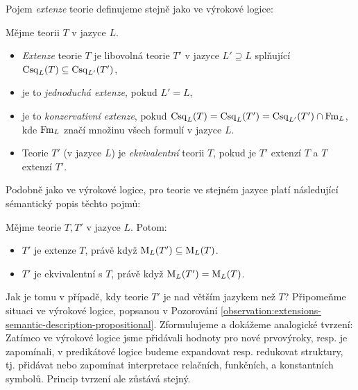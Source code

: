Pojem \emph{extenze} teorie definujeme stejně jako ve výrokové logice:

\begin{definition}
    Mějme teorii $T$ v jazyce $L$.
    \begin{itemize}
        \item \emph{Extenze} teorie $T$ je libovolná teorie $T'$ v jazyce $L'\supseteq L$ splňující $\operatorname{Csq}_L(T)\subseteq\operatorname{Csq}_{L'}(T')$,
        \item je to \emph{jednoduchá extenze}, pokud $L'=L$,
        \item je to \emph{konzervativní extenze}, pokud $\operatorname{Csq}_L(T)=\operatorname{Csq}_L(T')=\operatorname{Csq}_{L'}(T')\cap \operatorname{Fm}_L$, kde $\operatorname{Fm}_L$ značí množinu všech formulí v jazyce $L$.
        \item Teorie $T'$ (v jazyce $L$) je \emph{ekvivalentní} teorii $T$, pokud je $T'$ extenzí $T$ a $T$ extenzí $T'$.
    \end{itemize}
\end{definition}

Podobně jako ve výrokové logice, pro teorie ve stejném jazyce platí následující sémantický popis těchto pojmů:

\begin{observation}
Mějme teorie $T,T'$ v jazyce $L$. Potom:
\begin{itemize}
    \item $T'$ je extenze $T$, právě když $\operatorname{M}_L(T')\subseteq\operatorname{M}_L(T)$.
    \item $T'$ je ekvivalentní s $T$, právě když $\operatorname{M}_L(T')=\operatorname{M}_L(T)$.
\end{itemize}
\end{observation}

Jak je tomu v případě, kdy teorie $T'$ je nad větším jazykem než $T$? Připomeňme situaci ve výrokové logice, popsanou v Pozorování \ref{observation:extensions-semantic-description-propositional}. Zformulujeme a dokážeme analogické tvrzení: Zatímco ve výrokové logice jsme přidávali hodnoty pro nové prvovýroky, resp. je zapomínali, v predikátové logice budeme expandovat resp. redukovat struktury, tj. přidávat nebo zapomínat interpretace relačních, funkčních, a konstantních symbolů. Princip tvrzení ale zůstává stejný.

